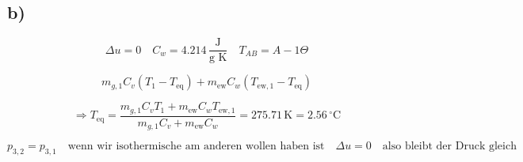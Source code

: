 

\subsection*{b)}
\[
\Delta u = 0 \quad C_w = 4.214 \, \frac{\text{J}}{\text{g K}} \quad T_{A B} = A - 1 \Theta
\]

\[
m_{g,1} C_v (T_{1} - T_{\text{eq}}) + m_{\text{ew}} C_w (T_{\text{ew},1} - T_{\text{eq}})
\]

\[
\Rightarrow T_{\text{eq}} = \frac{m_{g,1} C_v T_{1} + m_{\text{ew}} C_w T_{\text{ew},1}}{m_{g,1} C_v + m_{\text{ew}} C_w} = 275.71 \, \text{K} = 2.56 \, ^\circ \text{C}
\]

\[
p_{3,2} = p_{3,1} \quad \text{wenn wir isothermische am anderen wollen haben ist} \quad \Delta u = 0 \quad \text{also bleibt der Druck gleich}
\]